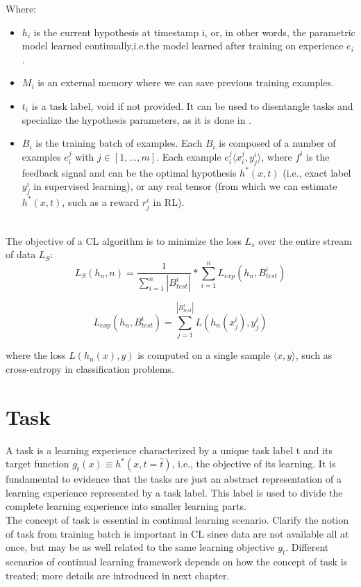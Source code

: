 \documentclass[english, LaM, oneside]{sapthesis}%
\begin{document}
Where:
\begin{itemize}
    \item $h_i$ is the current hypothesis at timestamp i, or, in other words, the parametric model learned continually,i.e.the model learned after training on experience $e_i$.
    \item $M_i$ is an external memory where we can save previous training examples.
    \item $t_i$ is a task label, void if not provided. It can be used to disentangle tasks and specialize the hypothesis parameters, as it is done in \cite{lopez}.
    \item $B_i$ is the training batch of examples. Each $B_i$ is composed of a number of examples $e_i^j$ with $j \in [1,...,m]$. Each example $e_i^j \langle x_i^j, y_j^i \rangle$, where $f^i$ is the feedback signal and can be the optimal hypothesis $h^\ast(x,t)$ (i.e., exact label $y_j^i$ in supervised learning), or any real tensor (from which we can estimate $h^\ast(x,t)$, such as a reward $r_j^i$ in RL).
\end{itemize}
\\
The objective of a CL algorithm is to minimize the loss $L_s$ over the entire stream of data $L_S$:
\begin{equation}
                L_S(h_n,n) = \frac{1}{\sum_{i=1}^{n}{|B_{test}^i|}} * \sum_{i=1}^{n}{L_{exp}(h_n,B_{test}^i)}
\end{equation}

\begin{equation}
                L_{exp}(h_n,B_{test}^i) = \sum_{j=1}^{|B_{test}^i|}{L(h_n(x_j^i),y_j^i)}
\end{equation}

where the loss $L(h_n(x),y)$ is computed on a single sample $\langle x,y \rangle$, such as cross-entropy in classification problems.






\section{Task}
A task is a learning experience characterized by a unique task label t and its target function $g_{\widehat{t}}(x) \equiv h^\ast(x, t = \hat{t})$, i.e., the objective of its learning.
It is fundamental to evidence that the tasks are just an abstract representation of a learning experience represented by a task label. This label is used to divide the complete learning experience into smaller learning parts.
\\
The concept of task is essential in continual learning scenario. Clarify the notion of task from training batch is important in CL since data are not available all at once, but may be as well related to the same learning objective $g_{\widehat{t}}$.
Different scenarios of continual learning framework depends on how the concept of task is treated; more details are introduced in next chapter.
\end{document}
